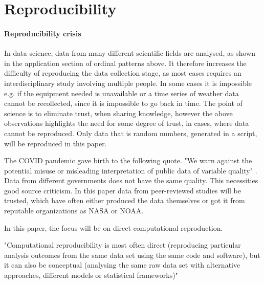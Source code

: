 \section{Reproducibility}
\paragraph{Reproducibility crisis}
In data science, data from many different scientific fields are analysed, as shown in the application section of ordinal patterns above. It therefore increases the difficulty of reproducing the data collection stage, as most cases requires an interdisciplinary study involving multiple people. In some cases it is impossible e.g. if the equipment needed is unavailable or a time series of weather data cannot be recollected, since it is impossible to go back in time. The point of science is to eliminate trust, when sharing knowledge, however the above observations highlights the need for some degree of trust, in cases, where data cannot be reproduced. Only data that is random numbers, generated in a script, will be reproduced in this paper.

The COVID pandemic gave birth to the following quote. "We warn against the potential misuse or misleading interpretation of public data of variable quality" \cite{Struelens2021}. Data from different governments does not have the same quality. This necessities good source criticism. In this paper data from peer-reviewed studies will be trusted, which have often either produced the data themselves or got it from reputable organizations as NASA or NOAA. 

In this paper, the focus will be on direct computational reproduction.

"Computational reproducibility is most often direct (reproducing particular analysis outcomes from the same data set using the same code and software), but it can also be conceptual (analysing the same raw data set with alternative approaches, different models or statistical frameworks)" \cite{Fidler2018}

